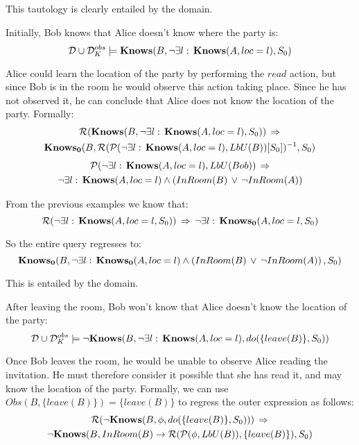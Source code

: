 This tautology is clearly entailed by the domain.\\


\begin{example}
Initially, Bob knows that Alice doesn't know where the party is:\[
\mathcal{D}\cup\mathcal{D}_{K}^{obs}\models\mathbf{Knows}(B,\neg\exists l:\,\mathbf{Knows}(A,loc=l),S_{0})\]

\end{example}
Alice could learn the location of the party by performing the $read$
action, but since Bob is in the room he would observe this action
taking place. Since he has not observed it, he can conclude that Alice
does not know the location of the party. Formally:\begin{multline*}
\mathcal{R}(\mathbf{Knows}(B,\neg\exists l:\,\mathbf{Knows}(A,loc=l),S_{0}))\,\Rightarrow\\
\mathbf{Knows_{0}}(B,\mathcal{R}(\mathcal{P}(\neg\exists l:\,\mathbf{Knows}(A,loc=l),LbU(B))[S_{0}])^{-1},S_{0})\end{multline*}
 \begin{multline*}
\mathcal{P}(\neg\exists l:\,\mathbf{Knows}(A,loc=l),LbU(Bob))\,\Rightarrow\\
\neg\exists l:\,\mathbf{Knows}(A,loc=l)\wedge\left(InRoom(B)\,\vee\,\neg InRoom(A)\right)\end{multline*}


From the previous examples we know that:\[
\mathcal{R}(\neg\exists l:\,\mathbf{Knows}(A,loc=l,S_{0}))\,\Rightarrow\,\neg\exists l:\,\mathbf{Knows_{0}}(A,loc=l,S_{0})\]


So the entire query regresses to:\[
\mathbf{Knows_{0}}(B,\neg\exists l:\,\mathbf{Knows_{0}}(A,loc=l)\wedge\left(InRoom(B)\,\vee\,\neg InRoom(A)\right),S_{0})\]


This is entailed by the domain.\\


\begin{example}
After leaving the room, Bob won't know that Alice doesn't know the
location of the party:\[
\mathcal{D}\cup\mathcal{D}_{K}^{obs}\models\mathbf{\neg Knows}(B,\neg\exists l:\,\mathbf{Knows}(A,loc=l),do(\{leave(B)\},S_{0}))\]

\end{example}
Once Bob leaves the room, he would be unable to observe Alice reading
the invitation. He must therefore consider it possible that she has
read it, and may know the location of the party. Formally, we can
use $Obs(B,\{leave(B)\})=\{leave(B)\}$ to regress the outer expression
as follows:\begin{multline*}
\mathcal{R}(\neg\mathbf{Knows}(B,\phi,do(\{leave(B)\},S_{0})))\,\Rightarrow\\
\neg\mathbf{Knows}(B,InRoom(B)\rightarrow\mathcal{R}(\mathcal{P}(\phi,LbU(B)),\{leave(B)\}),S_{0})\end{multline*}


